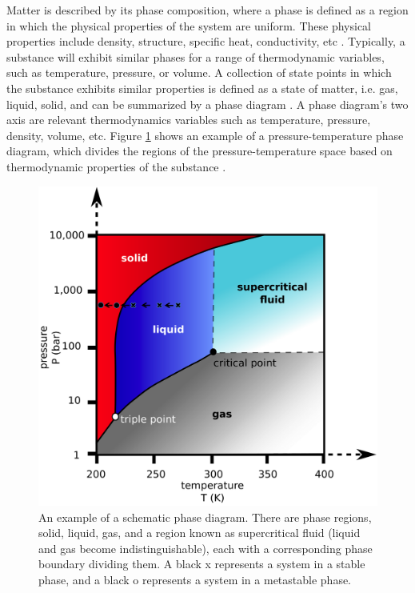 Matter is described by its phase composition, where a phase is defined as a region in which the physical properties of the system are uniform.  These physical properties include density, structure, specific heat, conductivity, etc \cite{HANSEN2006v}.  Typically, a substance will exhibit similar phases for a range of thermodynamic variables, such as temperature, pressure, or volume.  A collection of state points in which the substance exhibits similar properties is defined as a state of matter, i.e. gas, liquid, solid, and can be summarized by a phase diagram \cite{HANSEN2006v}.  A phase diagram's two axis are relevant thermodynamics variables such as temperature, pressure, density, volume, etc.  Figure \ref{phase diagram} shows an example of a pressure-temperature phase diagram, which divides the regions of the pressure-temperature space based on thermodynamic properties of the substance \cite{EGELSTAFF}. 

\begin{figure}[h]
	\centering
	\includegraphics[width = .5\textwidth]{./Figures/Introduction/phase_diagram.png}
	\caption[An example of a schematic phase diagram.  There are phase regions, solid, liquid, gas, and a region known as supercritical fluid (liquid and gas become indistinguishable), each with a corresponding phase boundary dividing them.  A black x represents a system in a stable phase, and a black o represents a system in a metastable phase.]{An example of a schematic phase diagram.  There are phase regions, solid, liquid, gas, and a region known as supercritical fluid (liquid and gas become indistinguishable), each with a corresponding phase boundary dividing them.  A black x represents a system in a stable phase, and a black o represents a system in a metastable phase.\cite{EGELSTAFF}}
	\label{phase diagram}
\end{figure}

